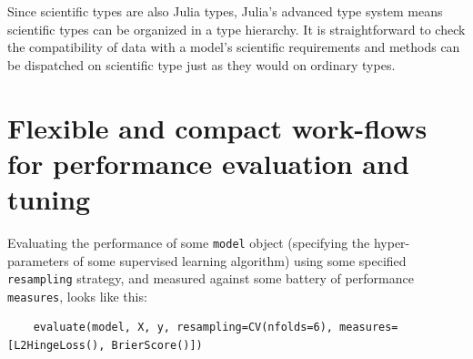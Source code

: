 \documentclass{article}
\begin{document}

Since scientific types are also Julia types, Julia's advanced type
system means scientific types can be organized in a type hierarchy.
It is straightforward to check the compatibility of data with a
model's scientific requirements and methods can be dispatched on
scientific type just as they would on ordinary types.





\section{Flexible and compact work-flows for performance evaluation and tuning}

Evaluating the performance of some \texttt{model} object (specifying
the hyper-parameters of some supervised learning algorithm) using some
specified \texttt{resampling} strategy, and measured against some
battery of performance \texttt{measures}, looks like this:

\begin{verbatim}
    evaluate(model, X, y, resampling=CV(nfolds=6), measures=[L2HingeLoss(), BrierScore()])
\end{verbatim}

\end{document}
